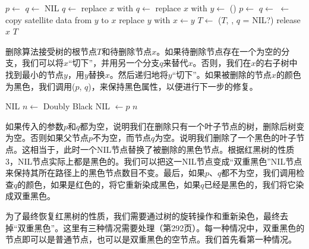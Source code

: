 \documentclass[UTF8]{article}
\begin{document}
\begin{algorithmic}[1]
  \State $p \gets$ 
  \State $q \gets$ NIL
    \State $q \gets$ 
    \State replace $x$ with 
    \State $q \gets$ 
    \State replace $x$ with 
  \Else
    \State $y \gets$ ()
    \State $p \gets$ 
    \State $q \gets$ 
    \State {} $\gets$ 
    \State copy satellite data from $y$ to $x$
    \State replace $y$ with 
    \State $x \gets y$
  \EndIf
    \State $T \gets$ ($T$, , $q$ = NIL?)
  \EndIf
  \State release $x$
  \State \Return $T$
\EndFunction
\end{algorithmic}

删除算法接受树的根节点$T$和待删除节点$x$。如果待删除节点存在一个为空的分支，我们可以将$x$“切下”，并用另一个分支$q$来替代$x$。否则，我们在$x$的右子树中找到最小的节点$y$，用$y$替换$x$。然后递归地将$y$“切下”。如果被删除的节点$x$的颜色为黑色，我们调用($p$, $q$)，来保持黑色属性，以便进行下一步的修复。

\begin{algorithmic}[1]
    \State \Return NIL 
    \State $n \gets$ Doubly Black NIL
    \State {} $\gets p$
    \State \Return $n$
  \Else
    \State \Return {}
  \EndIf
\EndFunction
\end{algorithmic}

如果传入的参数$p$和$q$都为空，说明我们在删除只有一个叶子节点的树，删除后树变为空。否则如果父节点$p$不为空，而节点$q$为空。说明我们删除了一个黑色的叶子节点。这相当于，此时一个NIL节点替换了被删除的黑色节点。根据红黑树的性质3，NIL节点实际上都是黑色的。我们可以把这一NIL节点变成“双重黑色”NIL节点来保持其所在路径上的黑色节点数目不变。最后，如果$p$、$q$都不为空，我们调用检查$q$的颜色，如果是红色的，将它重新染成黑色，如果$q$已经是黑色的，我们将它染成双重黑色。

为了最终恢复红黑树的性质，我们需要通过树的旋转操作和重新染色，最终去掉“双重黑色”。这里有三种情况需要处理（\cite{CLRS}第292页）。每一种情况中，双重黑色的节点即可以是普通节点，也可以是双重黑色的空节点。我们首先看第一种情况。
\end{document}
